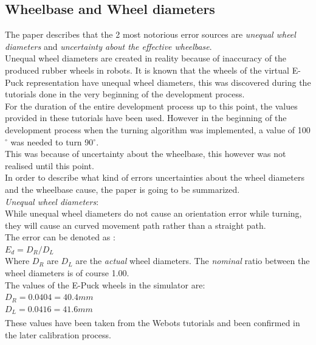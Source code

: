 \subsection{Wheelbase and Wheel diameters}
The paper describes that the 2 most notorious  error sources are \textit{unequal wheel diameters} and \textit{uncertainty about the effective wheelbase}.\\
Unequal wheel diameters are created in reality because of inaccuracy of the produced rubber wheels in robots. It is known that the wheels of the virtual E-Puck representation have unequal wheel diameters, this was discovered during the tutorials done in the very beginning of the development process.\\
For the duration of the entire development process up to this point, the values provided in these tutorials have been used. However in the beginning of the development process when the turning algorithm was implemented, a value of 100$^{\circ}$ was needed to turn 90$^{\circ}$.\\
This was because of uncertainty about the wheelbase, this however was not realised until this point.\\
In order to describe what kind of errors uncertainties about the wheel diameters and the wheelbase cause, the paper is going to be summarized. \\[3ex]

\textit{Unequal wheel diameters}:\\
While unequal wheel diameters do not cause an orientation error while turning, they will cause an curved movement path rather than a straight path.\\
The error can be denoted as :\\
$E_{d} = D_{R} / D_{L}$\\
Where $D_{R}$ are $D_{L}$ are the \textit{actual} wheel diameters. The \textit{nominal} ratio between the wheel diameters is of course 1.00\cite{Borenstein1996Measurement}.\\
The values of the E-Puck wheels in the simulator are:\\
$D_{R} = 0.0404 = 40.4mm$\\
$D_{L} = 0.0416 = 41.6mm$\\
These values have been taken from the Webots\textsuperscript{\texttrademark} tutorials and been confirmed in the later calibration process.\\

